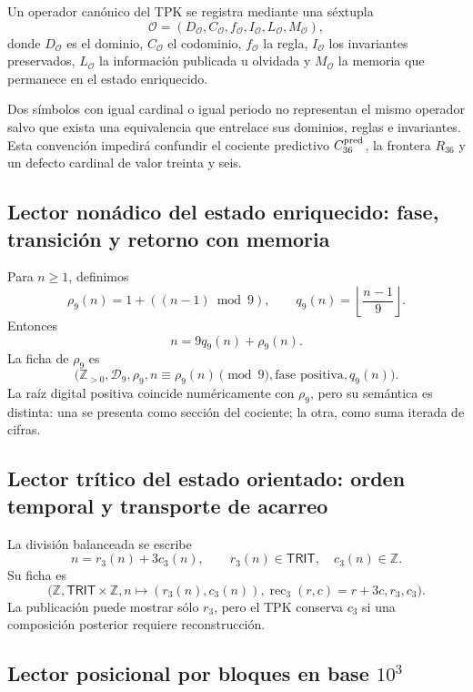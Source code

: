\begin{definition}
\label{p12-83-c1-s13:def:tpk-ficha-operatoria}
Un operador canónico del TPK se registra mediante una séxtupla
\[
 \mathcal O=(D_{\mathcal O},C_{\mathcal O},f_{\mathcal O},
 I_{\mathcal O},L_{\mathcal O},M_{\mathcal O}),
\]
donde \(D_{\mathcal O}\) es el dominio, \(C_{\mathcal O}\) el codominio,
\(f_{\mathcal O}\) la regla, \(I_{\mathcal O}\) los invariantes preservados,
\(L_{\mathcal O}\) la información publicada u olvidada y
\(M_{\mathcal O}\) la memoria que permanece en el estado enriquecido.
\end{definition}

Dos símbolos con igual cardinal o igual periodo no representan el mismo
operador salvo que exista una equivalencia que entrelace sus dominios,
reglas e invariantes. Esta convención impedirá confundir el cociente
predictivo \(C_{36}^{\rm pred}\), la frontera \(R_{36}\) y un defecto
cardinal de valor treinta y seis.

\subsection{Lector nonádico del estado enriquecido: fase, transición y retorno con memoria}

Para \(n\geq1\), definimos
\[
 \rho_9(n)=1+((n-1)\bmod9),
 \qquad
 q_9(n)=\left\lfloor\frac{n-1}{9}\right\rfloor.
\]
Entonces
\[
 n=9q_9(n)+\rho_9(n).
\]
La ficha de \(\rho_9\) es
\[
 \bigl(
 \mathbb Z_{>0},\mathcal D_9,\rho_9,
 n\equiv\rho_9(n)\pmod9,
 \text{fase positiva},
 q_9(n)
 \bigr).
\]
La raíz digital positiva coincide numéricamente con \(\rho_9\), pero su
semántica es distinta: una se presenta como sección del cociente; la otra,
como suma iterada de cifras.

\subsection{Lector trítico del estado orientado: orden temporal y transporte de acarreo}

La división balanceada se escribe
\[
 n=r_3(n)+3c_3(n),
 \qquad r_3(n)\in\mathsf{TRIT},\quad c_3(n)\in\mathbb Z.
\]
Su ficha es
\[
 \bigl(
 \mathbb Z,\mathsf{TRIT}\times\mathbb Z,
 n\mapsto(r_3(n),c_3(n)),
 \operatorname{rec}_3(r,c)=r+3c,
 r_3,
 c_3
 \bigr).
\]
La publicación puede mostrar sólo \(r_3\), pero el TPK conserva
\(c_3\) si una composición posterior requiere reconstrucción.

\subsection{Lector posicional por bloques en base \(10^3\)}

